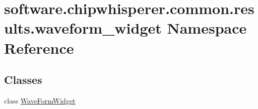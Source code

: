 \hypertarget{namespacesoftware_1_1chipwhisperer_1_1common_1_1results_1_1waveform__widget}{}\section{software.\+chipwhisperer.\+common.\+results.\+waveform\+\_\+widget Namespace Reference}
\label{namespacesoftware_1_1chipwhisperer_1_1common_1_1results_1_1waveform__widget}
\subsection*{Classes}
\begin{DoxyCompactItemize}
\item 
class \hyperlink{classsoftware_1_1chipwhisperer_1_1common_1_1results_1_1waveform__widget_1_1WaveFormWidget}{Wave\+Form\+Widget}
\end{DoxyCompactItemize}
